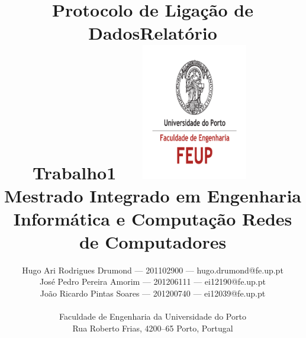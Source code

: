 \documentclass[a4paper]{article}
\begin{document}
\setlength{\textwidth}{16cm} \setlength{\textheight}{22cm}

\title{\Huge\textbf{Protocolo de Ligação de
    Dados}\linebreak\linebreak\linebreak \Large\textbf{Relatório \\
    Trabalho1}\linebreak\linebreak \includegraphics[height=6cm,
    width=7cm]{feup.pdf}\linebreak \linebreak \Large{Mestrado Integrado em
    Engenharia Informática e Computação} \linebreak \linebreak \Large{Redes de
Computadores} }

\author{Hugo Ari Rodrigues Drumond --- 201102900 --- hugo.drumond@fe.up.pt \\
    José Pedro Pereira Amorim --- 201206111 --- ei12190@fe.up.pt \\ João
    Ricardo Pintas Soares --- 201200740 ---
    ei12039@fe.up.pt\linebreak\linebreak\linebreak \\ \\ Faculdade de
    Engenharia da Universidade do Porto \\ Rua Roberto Frias, 4200--65 Porto,
    Portugal \linebreak\linebreak\linebreak \linebreak\linebreak\vspace{1cm}}
    \maketitle \thispagestyle{empty}
\end{document}
